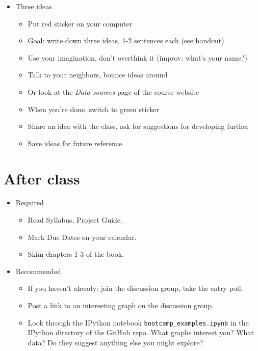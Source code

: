 \documentclass[11pt]{article}
\begin{document}
\begin{itemize}
\item Three ideas
\begin{itemize}
\item Put red sticker on your computer 
\item Goal:  write down three ideas, 1-2 sentences each (see handout) 
\item Use your imagination, don't overthink it (improv: what's your name?)
\item Talk to your neighbors, bounce ideas around
\item Or look at the {\it Data sources\/} page of the course website 
\item When you're done, switch to green sticker 
\item Share an idea with the class, ask for suggestions for developing further
\item Save ideas for future reference 
\end{itemize}
\end{itemize}


\section*{After class}

\begin{itemize}
\item Required
\begin{itemize}
\item Read Syllabus, Project Guide.
\item Mark Due Dates on your calendar.
\item Skim chapters 1-3 of the book.
\end{itemize}
\item Recommended
\begin{itemize}
\item If you haven't already:  join the discussion group, take the entry poll.
\item Post a link to an interesting graph on the discussion group.
\item Look through the IPython notebook \verb|bootcamp_examples.ipynb|
in the IPython directory of the GitHub repo.
What graphs interest you?  What data?
Do they suggest anything else you might explore?
\end{itemize}
\end{itemize}
\end{document}

